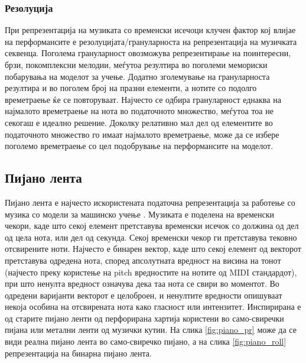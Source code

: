 \subsubsection{Резолуција}

При репрезентација на музиката со временски исечоци клучен фактор кој влијае на перформансите е резолуцијата/грануларноста на репрезентација на музичката секвенца. Поголема грануларност овозможува репрезентирање на поинтересни, брзи, покомплексни мелодии, меѓутоа резултира во поголеми мемориски побарувања на моделот за учење. Додатно зголемување на грануларноста резултира и во поголем број на празни елементи, а нотите со подолго времетраење ќе се повторуваат. Најчесто се одбира грануларност еднаква на најмалото времетраење на нота во податочното множество, меѓутоа тоа не секогаш е идеално решение. Доколку релативно мал дел од елементите во податочното множество го имаат најмалото времетраење, може да се избере поголемо времетраење со цел подобрување на перформансите на моделот.

\subsection{Пијано лента}

Пијано лента е најчесто искористената податочна репрезентација за работење со музика со модели за машинско учење \cite{Hadjeres2016,Boulanger-Lewandowski2012,Boulanger-Lewandowski2014,Eck2002,Eck2008,Walder2016,Dong2017,Dong2018}. Музиката е поделена на временски чекори, каде што секој елемент претставува временски исечок со должина од дел од цела нота, или дел од секунда. Секој временски чекор ги претставува тековно отсвирените ноти. Најчесто е бинарен вектор, каде што секој елемент од векторот претставува одредена нота, според апсолутната вредност на висина на тонот (најчесто преку користење на pitch вредностите на нотите од MIDI стандардот), при што ненулта вредност означува дека таа нота се свири во моментот. Во одредени варијанти векторот е целоброен, и ненултите вредности опишуваат некоја особина на отсвирената нота како гласност или интензитет. Инспирирана е од старите пијано ленти од перфорирана хартија користени во само-свиречки пијана или метални ленти од музички кутии. На слика \ref{fig:piano_pr} може да се види реална пијано лента во само-свиречко пијано, а на слика \ref{fig:piano_roll} репрезентација на бинарна пијано лента.

